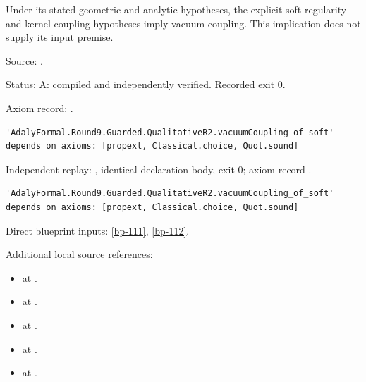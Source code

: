 \begin{theorem}[bp-290]
\label{bp-290}
\leanok
Under its stated geometric and analytic hypotheses, the explicit soft regularity and kernel-coupling hypotheses imply vacuum coupling. This implication does not supply its input premise.

\par Source: \texttt{}.
\par Status: A: compiled and independently verified. Recorded exit 0.
\par Axiom record: \texttt{}.
\begin{verbatim}
'AdalyFormal.Round9.Guarded.QualitativeR2.vacuumCoupling_of_soft' depends on axioms: [propext, Classical.choice, Quot.sound]
\end{verbatim}
\par Independent replay: \texttt{}, identical declaration body, exit 0; axiom record \texttt{}.
\begin{verbatim}
'AdalyFormal.Round9.Guarded.QualitativeR2.vacuumCoupling_of_soft' depends on axioms: [propext, Classical.choice, Quot.sound]
\end{verbatim}
\par Direct blueprint inputs: \ref{bp-111}, \ref{bp-112}.
\par Additional local source references:
\begin{itemize}
\item \texttt{} at \texttt{}.
\item \texttt{} at \texttt{}.
\item \texttt{} at \texttt{}.
\item \texttt{} at \texttt{}.
\item \texttt{} at \texttt{}.

\end{itemize}
\end{theorem}
